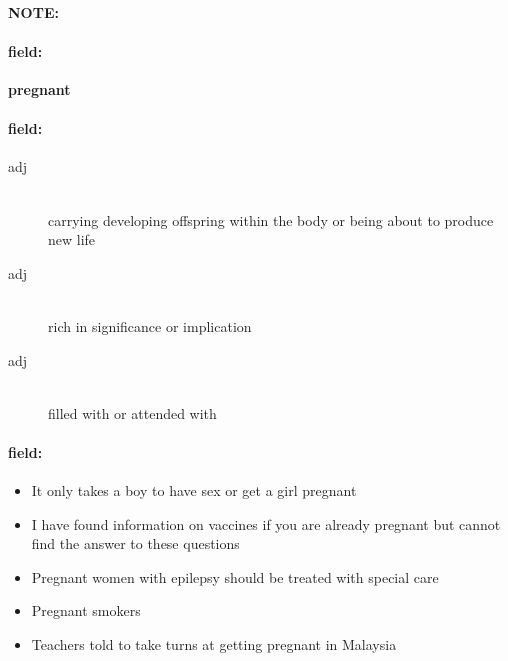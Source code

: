 \documentclass[12pt]{article}
\newenvironment{note}{\paragraph{NOTE:}}{}
\newenvironment{field}{\paragraph{field:}}{}
\begin{document}
\begin{note}
\begin{field}
\textbf{\large pregnant}
\end{field}


\begin{field}
\begin{description}
\item[adj] \hfill \\ 
carrying developing offspring within the body or being about to produce new life

\item[adj] \hfill \\ 
rich in significance or implication

\item[adj] \hfill \\ 
filled with or attended with

\end{description}
\end{field}

\begin{field}
\begin{itemize}
\item It only takes a boy to have sex or get a girl pregnant
\item I have found information on vaccines if you are already pregnant but cannot find the answer to these questions
\item Pregnant women with epilepsy should be treated with special care
\item Pregnant smokers
\item Teachers told to take turns at getting pregnant in Malaysia
\end{itemize}
\end{field}
\end{note}
\end{document}
